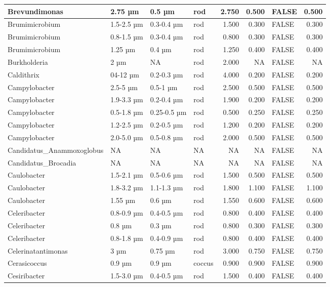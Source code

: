 \documentclass[
]{article}
\begin{document}
\begin{table}
\begin{tabular}{l|l|l|l|r|r|l|r}
\hline
Brevundimonas & 2.75 µm & 0.5 µm & rod & 2.750 & 0.500 & FALSE & 0.500\\
\hline
Brumimicrobium & 1.5-2.5 µm & 0.3-0.4 µm & rod & 1.500 & 0.300 & FALSE & 0.300\\
\hline
Brumimicrobium & 0.8-1.5 µm & 0.3-0.4 µm & rod & 0.800 & 0.300 & FALSE & 0.300\\
\hline
Brumimicrobium & 1.25 µm & 0.4 µm & rod & 1.250 & 0.400 & FALSE & 0.400\\
\hline
Burkholderia & 2 µm & NA & rod & 2.000 & NA & FALSE & NA\\
\hline
Caldithrix & 04-12 µm & 0.2-0.3 µm & rod & 4.000 & 0.200 & FALSE & 0.200\\
\hline
Campylobacter & 2.5-5 µm & 0.5-1 µm & rod & 2.500 & 0.500 & FALSE & 0.500\\
\hline
Campylobacter & 1.9-3.3 µm & 0.2-0.4 µm & rod & 1.900 & 0.200 & FALSE & 0.200\\
\hline
Campylobacter & 0.5-1.8 µm & 0.25-0.5 µm & rod & 0.500 & 0.250 & FALSE & 0.250\\
\hline
Campylobacter & 1.2-2.5 µm & 0.2-0.5 µm & rod & 1.200 & 0.200 & FALSE & 0.200\\
\hline
Campylobacter & 2.0-5.0 µm & 0.5-0.8 µm & rod & 2.000 & 0.500 & FALSE & 0.500\\
\hline
Candidatus\_Anammoxoglobus & NA & NA & NA & NA & NA & FALSE & NA\\
\hline
Candidatus\_Brocadia & NA & NA & NA & NA & NA & FALSE & NA\\
\hline
Caulobacter & 1.5-2.1 µm & 0.5-0.6 µm & rod & 1.500 & 0.500 & FALSE & 0.500\\
\hline
Caulobacter & 1.8-3.2 µm & 1.1-1.3 µm & rod & 1.800 & 1.100 & FALSE & 1.100\\
\hline
Caulobacter & 1.55 µm & 0.6 µm & rod & 1.550 & 0.600 & FALSE & 0.600\\
\hline
Celeribacter & 0.8-0.9 µm & 0.4-0.5 µm & rod & 0.800 & 0.400 & FALSE & 0.400\\
\hline
Celeribacter & 0.8 µm & 0.3 µm & rod & 0.800 & 0.300 & FALSE & 0.300\\
\hline
Celeribacter & 0.8-1.8 µm & 0.4-0.9 µm & rod & 0.800 & 0.400 & FALSE & 0.400\\
\hline
Celerinatantimonas & 3 µm & 0.75 µm & rod & 3.000 & 0.750 & FALSE & 0.750\\
\hline
Cerasicoccus & 0.9 µm & 0.9 µm & coccus & 0.900 & 0.900 & FALSE & 0.900\\
\hline
Cesiribacter & 1.5-3.0 µm & 0.4-0.5 µm & rod & 1.500 & 0.400 & FALSE & 0.400\\

\end{tabular}
\end{table}
\end{document}
